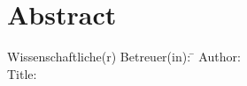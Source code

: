 \chapter*{Abstract}

\begin{minipage}{\textwidth}
		\begin{tabbing}
		Wissenschaftliche(r) Betreuer(in): \hspace{0.85cm}\=\kill
		Author: \> \DerAutorDerArbeit \\[1.5mm]
		Title: \> \DerTitelDerArbeit \\[1.5mm]
		\end{tabbing}
	\end{minipage}